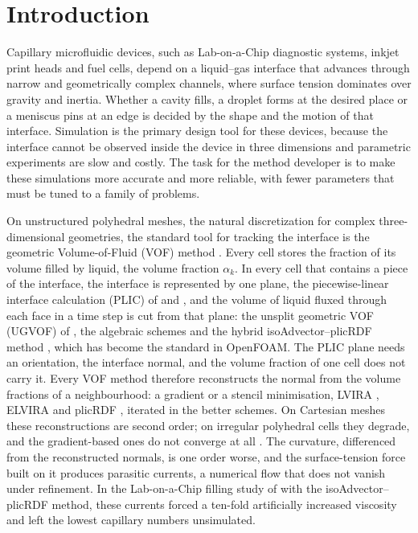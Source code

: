 \documentclass[preprint,12pt]{elsarticle}
\begin{document}
\section{Introduction}
\label{sec:intro}

Capillary microfluidic devices, such as Lab-on-a-Chip diagnostic systems, inkjet print heads and fuel cells, depend on a liquid--gas interface that advances through narrow and geometrically complex channels, where surface tension dominates over gravity and inertia. Whether a cavity fills, a droplet forms at the desired place or a meniscus pins at an edge is decided by the shape and the motion of that interface. Simulation is the primary design tool for these devices, because the interface cannot be observed inside the device in three dimensions and parametric experiments are slow and costly. The task for the method developer is to make these simulations more accurate and more reliable, with fewer parameters that must be tuned to a family of problems.

On unstructured polyhedral meshes, the natural discretization for complex three-dimensional geometries, the standard tool for tracking the interface is the geometric Volume-of-Fluid (VOF) method \citep{MaricKotheBothe2020}. Every cell stores the fraction of its volume filled by liquid, the volume fraction $\alpha_k$. In every cell that contains a piece of the interface, the interface is represented by one plane, the piecewise-linear interface calculation (PLIC) of \citet{Youngs1982} and \citet{RiderKothe1998}, and the volume of liquid fluxed through each face in a time step is cut from that plane: the unsplit geometric VOF (UGVOF) of \citet{MaricMarschallBothe2018}, the algebraic schemes \citep{Xie2017,Qian2018} and the hybrid isoAdvector--plicRDF method \citep{RoenbyEtAl2016,ScheuflerRoenby2019,Dianat2017}, which has become the standard in OpenFOAM. The PLIC plane needs an orientation, the interface normal, and the volume fraction of one cell does not carry it. Every VOF method therefore reconstructs the normal from the volume fractions of a neighbourhood: a gradient \citep{Youngs1982} or a stencil minimisation, LVIRA \citep{Puckett1991}, ELVIRA \citep{PilliodPuckett2004} and plicRDF \citep{ScheuflerRoenby2019}, iterated in the better schemes. On Cartesian meshes these reconstructions are second order; on irregular polyhedral cells they degrade, and the gradient-based ones do not converge at all \citep{PilliodPuckett2004}. The curvature, differenced from the reconstructed normals, is one order worse, and the surface-tension force built on it produces parasitic currents, a numerical flow that does not vanish under refinement. In the Lab-on-a-Chip filling study of \citet{NagelEtAl2024,NagelEtAl2025MicrocavityFilling} with the isoAdvector--plicRDF method, these currents forced a ten-fold artificially increased viscosity and left the lowest capillary numbers unsimulated.
\end{document}
